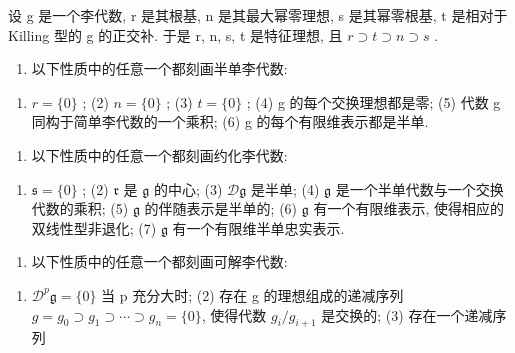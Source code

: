 

设 g 是一个李代数, r 是其根基, n 是其最大幂零理想, s 是其幂零根基, t 是相对于 Killing 型的 g 的正交补. 于是 r, n, s, t 是特征理想, 且 \(r \supset t \supset n \supset s\) .

\begin{enumerate}
\def\labelenumi{(\Roman{enumi})}
\tightlist
\item
  以下性质中的任意一个都刻画半单李代数:
\end{enumerate}

\begin{enumerate}
\def\labelenumi{(\arabic{enumi})}
\tightlist
\item
  \(r = \{0\}\) ; (2) \(n = \{0\}\) ; (3) \(t = \{0\}\) ; (4) g 的每个交换理想都是零; (5) 代数 g 同构于简单李代数的一个乘积; (6) g 的每个有限维表示都是半单.
\end{enumerate}

\begin{enumerate}
\def\labelenumi{(\Roman{enumi})}
\setcounter{enumi}{1}
\tightlist
\item
  以下性质中的任意一个都刻画约化李代数:
\end{enumerate}

\begin{enumerate}
\def\labelenumi{(\arabic{enumi})}
\tightlist
\item
  \(\mathfrak{s} = \{0\}\) ; (2) \(\mathfrak{r}\) 是 \(\mathfrak{g}\) 的中心; (3) \(\mathcal{D}\mathfrak{g}\) 是半单; (4) \(\mathfrak{g}\) 是一个半单代数与一个交换代数的乘积; (5) \(\mathfrak{g}\) 的伴随表示是半单的; (6) \(\mathfrak{g}\) 有一个有限维表示, 使得相应的双线性型非退化; (7) \(\mathfrak{g}\) 有一个有限维半单忠实表示.
\end{enumerate}

\begin{enumerate}
\def\labelenumi{(\Roman{enumi})}
\setcounter{enumi}{2}
\tightlist
\item
  以下性质中的任意一个都刻画可解李代数:
\end{enumerate}

\begin{enumerate}
\def\labelenumi{(\arabic{enumi})}
\tightlist
\item
  \(\mathcal{D}^{p}\mathfrak{g} = \{0\}\) 当 p 充分大时; (2) 存在 g 的理想组成的递减序列 \(g = g_{0} \supset g_{1} \supset \cdots \supset g_{n} = \{0\}\), 使得代数 \(g_{i}/g_{i+1}\) 是交换的; (3) 存在一个递减序列
\end{enumerate}

